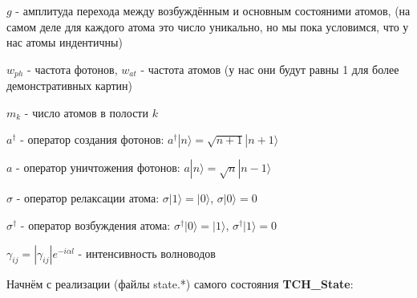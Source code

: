 \documentclass[12pt,fleqn]{article}
\begin{document}
		$g$ - амплитуда перехода между возбуждённым и основным состояними атомов, (на самом деле для каждого атома это число уникально, но мы пока условимся, что у нас атомы индентичны)

		$w_{ph}$ - частота фотонов, $w_{at}$ - частота атомов (у нас они будут равны 1 для более демонстративных картин)

		$m_k$ - число атомов в полости $k$

        $a^{\dagger}$ - оператор создания фотонов: $a^{\dagger}|n\rangle = \sqrt{n + 1}|n + 1\rangle$

        $a$ - оператор уничтожения фотонов: $a|n\rangle = \sqrt{n}|n - 1\rangle$

        $\sigma$ - оператор релаксации атома: $\sigma|1\rangle = |0\rangle$, $\sigma|0\rangle = 0$

        $\sigma^{\dagger}$ - оператор возбуждения атома: $\sigma^{\dagger}|0\rangle = |1\rangle$, $\sigma^{\dagger}|1\rangle = 0$

        $\gamma_{ij} = |\gamma_{ij}|e^{-i\alpha l}$ - интенсивность волноводов

        Начнём с реализации (файлы \textsf{state.*}) самого состояния \textbf{TCH\_State}:
\end{document}
